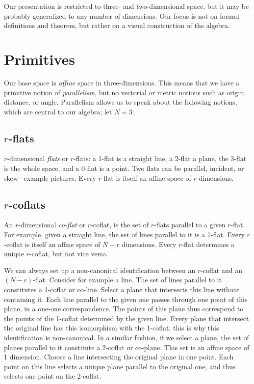 \documentclass[\ifafour a4paper,12pt,\else a5paper,10pt,\fi%
onecolumn,oneside,article,%
british%
]{memoir}
\theoremstyle{remark}
\theoremstyle{innote}
\renewcommand*{\|}{\nonscript\,\vert\nonscript\;\mathopen{}}
\newcommand*{\puzzle}{{\fontencoding{U}\fontfamily{fontawesometwo}\selectfont\symbol{225}}}
\newcommand{\mynote}[1]{ {\color{notecolour}\puzzle\ #1}}
\newcommand*{\yr}{r}
\newcommand*{\yN}{N}
\begin{document}
Our presentation is restricted to three- and two-dimensional space, but it
may be probably generalized to any number of dimensions. Our focus is not
on formal definitions and theorem, but rather on a visual construction of
the algebra.

\section{Primitives}
\label{sec:primitives}

Our base space is \emph{affine} space in three-dimensions. This means that
we have a primitive notion of \emph{parallelism}, but no vectorial or
metric notions such as origin, distance, or angle. Parallelism allows us to
speak about the following notions, which are central to our algebra; let
$\yN=3$:

\subsection{$\yr$-flats}
\label{sec:flats}

$\yr$-dimensional \emph{flats} or $\yr$-flats: a 1-flat is a straight line,
a 2-flat a plane, the 3-flat is the whole space, and a 0-flat is a point.
Two flats can be parallel, incident, or skew \mynote{example pictures}.
Every $\yr$-flat is itself an affine space of $\yr$ dimensions.

\subsection{$\yr$-coflats}
\label{sec:coflats}

An $\yr$-dimensional \emph{co-flat} or $\yr$-coflat, is the set of
$\yr$-flats parallel to a given $\yr$-flat. For example, given a straight
line, the set of lines parallel to it is a 1-flat. Every $\yr$-coflat is
itself an affine space of $\yN-\yr$ dimensions. Every $\yr$-flat determines
a unique $\yr$-coflat, but not vice versa.

We can always set up a non-canonical identification between an $\yr$-coflat
and an $(\yN-\yr)$-flat. Consider for example a line. The set of lines
parallel to it constitutes a 1-coflat or co-line. Select a plane that
intersects this line without containing it. Each line parallel to the given
one passes through one point of this plane, in a one-one correspondence.
The points of this plane thus correspond to the points of the 1-coflat
determined by the given line. Every plane that intersect the original line
has this isomorphism with the 1-coflat; this is why this identification is
non-canonical. In a similar fashion, if we select a plane, the set of
planes parallel to it constitute a 2-coflat or co-plane. This set is an
affine space of 1 dimension. Choose a line intersecting the original plane
in one point. Each point on this line selects a unique plane parallel to
the original one, and thus selects one point on the 2-coflat.
\end{document}
